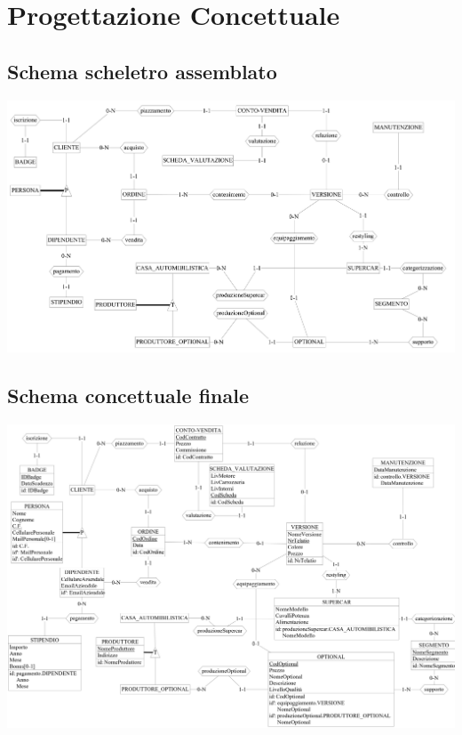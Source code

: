 \documentclass[11pt]{article}
\begin{document}
\section{Progettazione Concettuale}

\subsection{Schema scheletro assemblato}

\begin{center}
    \includegraphics[scale=0.60, angle=90]{images/fullSchemes/scheletro.png}
\end{center}

\newpage

\subsection{Schema concettuale finale}
\begin{center}
    \includegraphics[height=\linewidth, angle=90]{images/fullSchemes/finale.jpeg}
\end{center}
\end{document}
